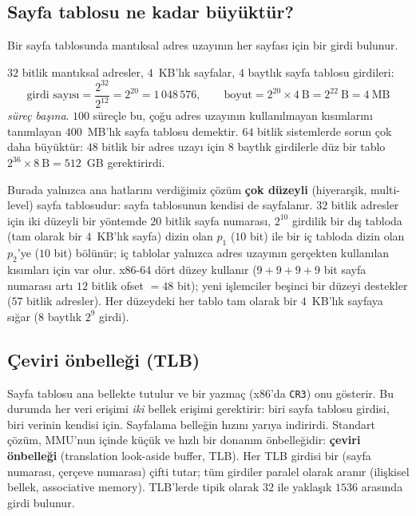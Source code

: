 \documentclass[11pt,a4paper]{article}
\newcommand{\term}[1]{\textbf{\color{mintdeep}#1}}
\begin{document}
\subsection{Sayfa tablosu ne kadar büyüktür?}

Bir sayfa tablosunda mantıksal adres uzayının her sayfası için bir girdi bulunur.

\begin{example}
$32$ bitlik mantıksal adresler, $4$~KB'lık sayfalar, $4$ baytlık sayfa tablosu girdileri:
\[
\text{girdi sayısı} = \frac{2^{32}}{2^{12}} = 2^{20} = 1\,048\,576,
\qquad
\text{boyut} = 2^{20} \times 4\ \text{B} = 2^{22}\ \text{B} = 4\ \text{MB}
\]
\emph{süreç başına}. $100$ süreçle bu, çoğu adres uzayının kullanılmayan kısımlarını tanımlayan $400$~MB'lık sayfa tablosu demektir. $64$ bitlik sistemlerde sorun çok daha büyüktür: $48$ bitlik bir adres uzayı için $8$ baytlık girdilerle düz bir tablo $2^{36} \times 8\ \text{B} = 512$~GB gerektirirdi.
\end{example}

Burada yalnızca ana hatlarını verdiğimiz çözüm \term{çok düzeyli} (hiyerarşik, multi-level) sayfa tablosudur: sayfa tablosunun kendisi de sayfalanır. $32$ bitlik adresler için iki düzeyli bir yöntemde $20$ bitlik sayfa numarası, $2^{10}$ girdilik bir dış tabloda (tam olarak bir $4$~KB'lık sayfa) dizin olan $p_1$ ($10$ bit) ile bir iç tabloda dizin olan $p_2$'ye ($10$ bit) bölünür; iç tablolar yalnızca adres uzayının gerçekten kullanılan kısımları için var olur. x86-64 dört düzey kullanır ($9+9+9+9$ bit sayfa numarası artı $12$ bitlik ofset $=48$ bit); yeni işlemciler beşinci bir düzeyi destekler ($57$ bitlik adresler). Her düzeydeki her tablo tam olarak bir $4$~KB'lık sayfaya sığar ($8$ baytlık $2^{9}$ girdi).

\subsection{Çeviri önbelleği (TLB)}

Sayfa tablosu ana bellekte tutulur ve bir yazmaç (x86'da \texttt{CR3}) onu gösterir. Bu durumda her veri erişimi \emph{iki} bellek erişimi gerektirir: biri sayfa tablosu girdisi, biri verinin kendisi için. Sayfalama belleğin hızını yarıya indirirdi. Standart çözüm, MMU'nun içinde küçük ve hızlı bir donanım önbelleğidir: \term{çeviri önbelleği} (translation look-aside buffer, TLB). Her TLB girdisi bir (sayfa numarası, çerçeve numarası) çifti tutar; tüm girdiler paralel olarak aranır (ilişkisel bellek, associative memory). TLB'lerde tipik olarak $32$ ile yaklaşık $1536$ arasında girdi bulunur.
\end{document}
